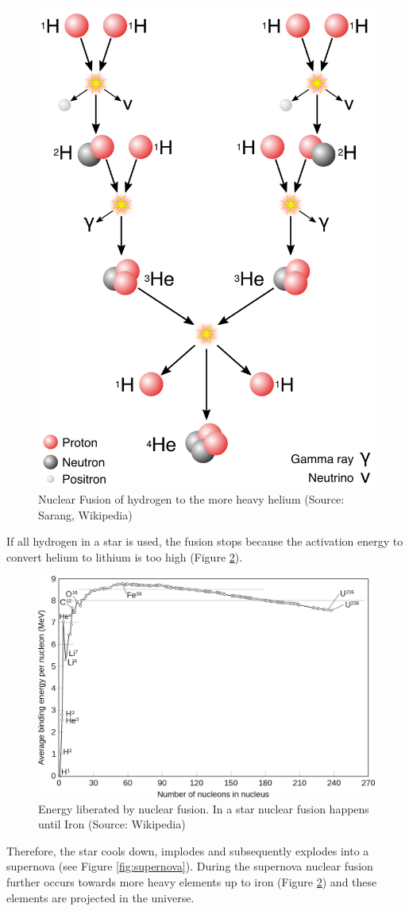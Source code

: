 \documentclass[
  11pt,
]{book}
\begin{document}
\begin{figure}

{\centering \includegraphics[width=0.5\linewidth]{./figs/fusion} 

}

\caption{Nuclear Fusion of hydrogen to the more heavy helium (Source: Sarang, Wikipedia)}\label{fig:nuclearFusion}
\end{figure}

If all hydrogen in a star is used, the fusion stops because the activation energy to convert helium to lithium is too high (Figure \ref{fig:fusionEnergy}).

\begin{figure}

{\centering \includegraphics[width=0.5\linewidth]{./figs/fusionEnergy} 

}

\caption{Energy liberated by nuclear fusion. In a star nuclear fusion happens until Iron (Source: Wikipedia)}\label{fig:fusionEnergy}
\end{figure}

Therefore, the star cools down, implodes and subsequently explodes into a supernova (see Figure \ref{fig:supernova}). During the supernova nuclear fusion further occurs towards more heavy elements up to iron (Figure \ref{fig:fusionEnergy}) and these elements are projected in the universe.
\end{document}
